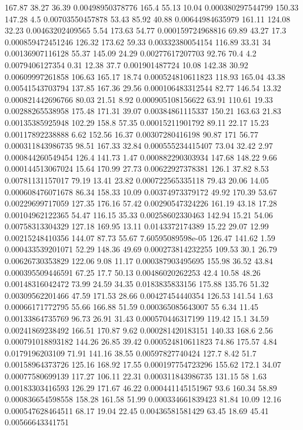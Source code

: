 167.87 38.27 36.39 0.00498950378776
165.4 55.13 10.04 0.000380297544799
150.33 147.28 4.5 0.00703550457878
53.43 85.92 40.88 0.00644984635979
161.11 124.08 32.23 0.00463202409565
5.54 173.63 54.77 0.000159724968816
69.89 43.27 17.3 0.000859472451246
126.32 173.62 59.33 0.00332380054154
116.89 33.31 34 0.00136907116128
55.37 145.09 24.29 0.00277617207703
92.76 70.4 4.2 0.0079406127354
0.31 12.38 37.7 0.001901487724
10.08 142.38 30.92 0.00609997261858
106.63 165.17 18.74 0.000524810611823
118.93 165.04 43.38 0.00541543703794
137.85 167.36 29.56 0.000106483312544
82.77 146.54 13.32 0.000821442696766
80.03 21.51 8.92 0.000905108156622
63.91 110.61 19.33 0.00288265538958
175.48 171.31 39.07 0.00384861115337
150.21 163.63 21.83 0.00135385925948
102.29 158.8 57.35 0.00015211901792
89.11 22.17 15.23 0.00117892238888
6.62 152.56 16.37 0.00307280416198
90.87 171 56.77 0.000311843986735
98.51 167.33 32.84 0.000555234415407
73.04 32.42 2.97 0.000844260549454
126.4 141.73 1.47 0.000882290303934
147.68 148.22 9.66 0.000144513067024
15.64 170.99 27.73 0.00622927378381
126.1 37.82 8.53 0.00781131157017
79.19 13.41 23.82 0.000722565335118
79.43 20.06 14.05 0.000608476071678
86.34 158.33 10.09 0.00374973379172
49.92 170.39 53.67 0.00229699717059
127.35 176.16 57.42 0.00290547324226
161.19 43.18 17.28 0.00104962122365
54.47 116.15 35.33 0.00258602330463
142.94 15.21 54.06 0.00758313304329
127.18 169.95 13.11 0.0143372174389
15.22 29.07 12.99 0.00215248410356
144.07 87.73 55.67 7.60595089598e-05
126.47 141.62 1.59 0.000433539201071
52.29 148.36 49.69 0.000273814232255
109.53 30.1 26.79 0.00626730353829
122.06 9.08 11.17 0.000387903495695
155.98 36.52 43.84 0.000395509446591
67.25 17.7 50.13 0.00486020262253
42.4 10.58 48.26 0.00148316042472
73.99 24.59 34.35 0.0183835833156
175.88 135.76 51.32 0.00309562201466
47.59 171.53 28.66 0.00427454440354
126.53 141.54 1.63 0.00066171772795
55.66 166.88 51.59 0.000365085643007
55 6.34 11.45 0.00133864735769
96.73 26.91 31.43 0.000570446317199
119.42 15.1 34.59 0.00241869238492
166.51 170.87 9.62 0.000281420183151
140.33 168.6 2.56 0.000791018893182
144.26 26.85 39.42 0.000524810611823
74.86 175.57 4.84 0.0179196203109
71.91 141.16 38.55 0.00597827740424
127.7 8.42 51.7 0.00158964373726
125.16 168.92 17.55 0.000197754723296
155.62 172.1 34.07 0.00077580699139
117.27 106.11 22.31 0.000311843986735
131.15 58 1.63 0.00183303416593
126.29 171.67 46.22 0.000441145151967
93.6 160.34 58.89 0.000836654598558
158.28 161.58 51.99 0.000334661839423
81.84 10.09 12.16 0.000547628464511
68.17 19.04 22.45 0.00436581581429
63.45 18.69 45.41 0.00566643341751
